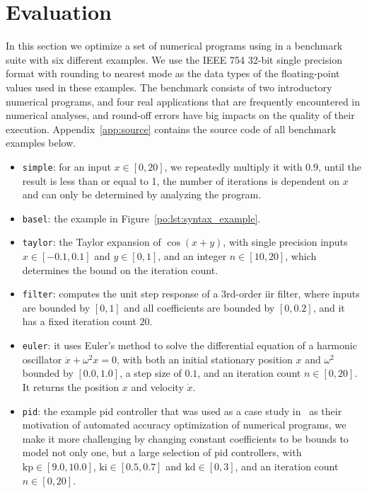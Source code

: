 \section{Evaluation}
\label{po:sec:results}


In this section we optimize a set of numerical programs using \soap{} in a
benchmark suite with six different examples.  We use the IEEE 754 32-bit
single precision format with rounding to nearest mode as the data types of the
floating-point values used in these examples.  The benchmark consists of two
introductory numerical programs, and four real applications that are frequently
encountered in numerical analyses, and round-off errors have big impacts on the
quality of their execution.  Appendix~\ref{app:source} contains the source code
of all benchmark examples below.
\begin{itemize}

    \item \texttt{simple}: for an input $x \in [0, 20]$, we repeatedly multiply
    it with $0.9$, until the result is less than or equal to 1, the number of
    iterations is dependent on $x$ and can only be determined by analyzing the
    program.

    \item \texttt{basel}: the example in Figure~\ref{po:lst:syntax_example}.

    \item \texttt{taylor}: the Taylor expansion of $\cos(x + y)$, with single
    precision inputs $x \in [-0.1, 0.1]$ and $y \in [0, 1]$, and an integer $n
    \in [10, 20]$, which determines the bound on the iteration count.

    \item \texttt{filter}: computes the unit step response of a 3rd-order
    \gls{iir} filter, where inputs are bounded by $[0, 1]$ and all coefficients
    are bounded by $[0, 0.2]$, and it has a fixed iteration count $20$.

    \item \texttt{euler}: it uses Euler's method to solve the differential
    equation of a harmonic oscillator $\ddot{x} + \omega^2 x = 0$, with both an
    initial stationary position $x$ and $\omega^2$ bounded by $[0.0, 1.0]$, a
    step size of $0.1$, and an iteration count $n \in [0, 20]$.  It returns the
    position $x$ and velocity $\dot{x}$.

    \item \texttt{pid}: the example \gls{pid} controller that was used as a
    case study in~\cite{damouche14} as their motivation of automated accuracy
    optimization of numerical programs, we make it more challenging by changing
    constant coefficients to be bounds to model not only one, but a large
    selection of \gls{pid} controllers, with $\mathrm{kp} \in [9.0, 10.0]$,
    $\mathrm{ki} \in [0.5, 0.7]$ and $\mathrm{kd} \in [0, 3]$, and an iteration
    count $n \in [0, 20]$.

\end{itemize}

